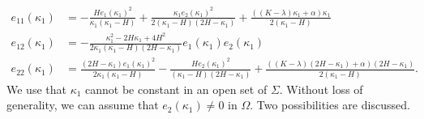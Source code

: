 \documentclass[a4paper,12pt]{amsart}
\theoremstyle{definition}
\begin{document}
\begin{subequations}
 \begin{align}e_{11}(\kappa_1)&=-\frac{He_1(\kappa_1)^2}{\kappa_1(\kappa_1-H)}+\frac{\kappa_1 e_2(\kappa_1)^2}{2(\kappa_1-H)(2H-\kappa_1)}+\frac{((K-\lambda)\kappa_1+\alpha)\kappa_1}{2(\kappa_1-H)}\label{d7}\\
e_{12}(\kappa_1)&=-\frac{\kappa_1^2-2H\kappa_1+4H^2}{2\kappa_1(\kappa_1-H)(2H-\kappa_1)}e_1(\kappa_1)e_2(\kappa_1)\label{d9}\\
e_{22}(\kappa_1)&=\frac{(2H-\kappa_1)e_1(\kappa_1)^2}{2\kappa_1(\kappa_1-H)}-\frac{He_2(\kappa_1)^2}{(\kappa_1-H)(2H-\kappa_1)}+\frac{\left((K-\lambda)(2H-\kappa_1)+\alpha\right)(2H-\kappa_1)}{2(\kappa_1-H)}.\label{d10}
\end{align}
\end{subequations}
We use that  $\kappa_1$ cannot be constant in an open set of $\Sigma$. Without loss of generality, we can assume that $e_2(\kappa_1)\not=0$ in $\Omega$. Two possibilities are discussed.
\end{document}
